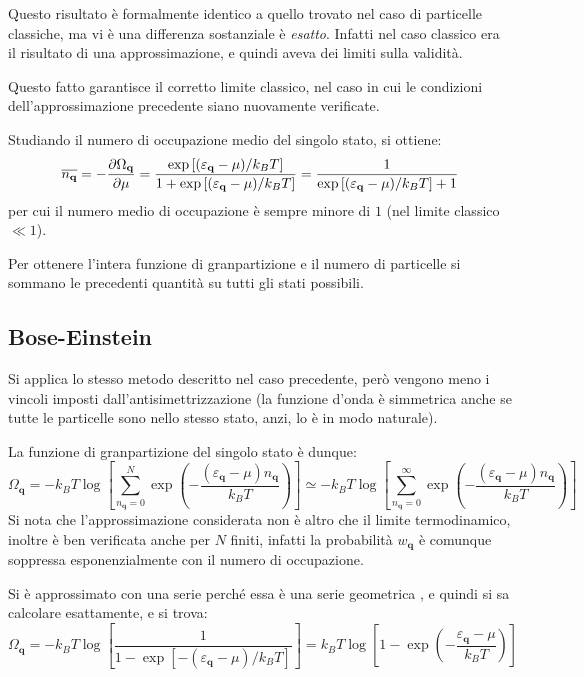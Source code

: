 Questo risultato è formalmente identico a quello trovato nel caso di particelle classiche, ma vi è una differenza sostanziale è \textit{esatto}. 
Infatti nel caso classico era il risultato di una approssimazione, e quindi aveva dei limiti sulla validità.

Questo fatto garantisce il corretto limite classico, nel caso in cui le condizioni dell'approssimazione precedente siano nuovamente verificate.
\newline

Studiando il numero di occupazione medio del singolo stato, si ottiene:
\begin{equation*}
\overline{n_{\textbf{q}}} = - \frac{\partial {\Omega_{\textbf{q}}}}{\partial {\mu}} = \frac{\exp\left[(\varepsilon_{\textbf{q}} - \mu)/k_B T\right]}{1 + \exp\left[(\varepsilon_{\textbf{q}} - \mu)/k_B T\right]} = \frac{1}{\exp\left[(\varepsilon_{\textbf{q}} - \mu)/k_B T\right] + 1}
\end{equation*}
per cui il numero medio di occupazione è sempre minore di $1$ (nel limite classico $\ll 1$).

Per ottenere l'intera funzione di granpartizione e il numero di particelle si sommano le precedenti quantità su tutti gli stati possibili.

\subsection{Bose-Einstein}
Si applica lo stesso metodo descritto nel caso precedente, però vengono meno i vincoli imposti dall'antisimettrizzazione (la funzione d'onda è simmetrica anche se tutte le particelle sono nello stesso stato, anzi, lo è in modo naturale).

La funzione di granpartizione del singolo stato è dunque:
\begin{equation*}
\Omega_{\textbf{q}} = - k_B T \log \left[\sum_{n_{\textbf{q}}=0}^{N} \exp \left(-\frac{(\varepsilon_{\textbf{q}} - \mu )n_{\textbf{q}}}{k_B T}\right)\right] \simeq - k_B T \log \left[\sum_{n_{\textbf{q}}=0}^{\infty} \exp \left(-\frac{(\varepsilon_{\textbf{q}} - \mu) n_{\textbf{q}}}{k_B T}\right)\right]
\end{equation*}
Si nota che l'approssimazione considerata non è altro che il limite termodinamico, inoltre è ben verificata anche per $N$ finiti, infatti la probabilità $w_{\textbf{q}}$ è comunque soppressa esponenzialmente con il numero di occupazione.

Si è approssimato con una serie perché essa è una serie geometrica \footnotemark, e quindi si sa calcolare esattamente, e si trova:
\begin{equation*}
\Omega_{\textbf{q}} = - k_B T \log \left[\frac{1}{1 - \exp[-(\varepsilon_{\textbf{q}} - \mu)/k_B T]}\right] = k_B T \log \left[1 - \exp(-\frac{\varepsilon_{\textbf{q}} - \mu}{k_B T})\right]
\end{equation*}

